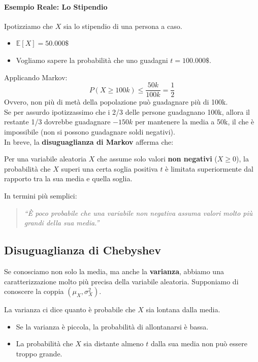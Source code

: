 \paragraph{Esempio Reale: Lo Stipendio}
Ipotizziamo che $X$ sia lo stipendio di una persona a caso.
\begin{itemize}
    \item $\mathbb{E}[X] = 50.000\$$
    \item Vogliamo sapere la probabilità che uno guadagni $t = 100.000\$$.
\end{itemize}
Applicando Markov:
\[ P(X \ge 100k) \le \frac{50k}{100k} = \frac{1}{2} \]
Ovvero, non più di metà della popolazione può guadagnare più di 100k.
\\Se per assurdo ipotizzassimo che i 2/3 delle persone guadagnano 100k, allora il restante 1/3 dovrebbe guadagnare $-150k$ per mantenere la media a 50k, il che è impossibile (non si possono guadagnare soldi negativi).
\\In breve, la \textbf{disuguaglianza di Markov} afferma che:

Per una variabile aleatoria $X$ che assume solo valori \textbf{non negativi} ($X \ge 0$), la probabilità che $X$ superi una certa soglia positiva $t$ è limitata superiormente dal rapporto tra la sua media e quella soglia.

In termini più semplici:
\begin{quote}
    \textit{``È poco probabile che una variabile non negativa assuma valori molto più grandi della sua media.''}
\end{quote}

\newpage
\subsection{Disuguaglianza di Chebyshev}

Se conosciamo non solo la media, ma anche la \textbf{varianza}, abbiamo una caratterizzazione molto più precisa della variabile aleatoria. Supponiamo di conoscere la coppia $(\mu_X, \sigma_X^2)$.

La varianza ci dice quanto è probabile che $X$ sia lontana dalla media.
\begin{itemize}
    \item Se la varianza è piccola, la probabilità di allontanarsi è bassa.
    \item La probabilità che $X$ sia distante almeno $t$ dalla sua media non può essere troppo grande.
\end{itemize}

